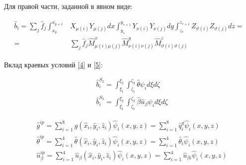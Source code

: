 \documentclass[12pt, a4paper]{article}
\begin{document}
\vspace{3mm}
\noindent Для правой части, заданной в явном виде:

\begin{align}
  \begin{split}
    \hat{b}_i 
    = \sum_{j}\hat{f}_j
      \int_{x_p}^{x_{p+1}}&X_{\mu(i)}Y_{\mu(j)}dx
      \int_{y_s}^{y_{s+1}}Y_{\nu(i)}Y_{\nu(j)}dy
      \int_{z_r}^{z_{r+1}}Z_{\vartheta(i)}Z_{\vartheta(j)}dz = \\
    = &\sum_{j}\hat{f}_j 
      \hat{M}_{\mu(i)\mu(j)}^x 
      \hat{M}_{\nu(i)\nu(j)}^y 
      \hat{M}_{\vartheta(i)\vartheta(j)}^z
  \end{split}
\end{align}

\vspace{3mm}
\noindent Вклад краевых условий \ref{4} и \ref{5}:

\begin{align}
  &\hat{b}_{i}^{S_2} =  \int_{\xi_1}^{\xi_2}
                        \int_{\zeta_1}^{\zeta_2}
                        \hat{\theta}\psi_{i} d\xi d\zeta \\
  &\hat{b}_{i}^{S_3} =  \int_{\xi_1}^{\xi_2}
                      \int_{\zeta_1}^{\zeta_2}
                      \hat{\beta}\hat{u}_{\beta}\psi_{i} d\xi d\zeta
\end{align}

\begin{align}
  &\hat{g}^{ip} 
    = \sum_{i=1}^{8}
        g(\hat{x}_i, \hat{y}_i, \hat{z}_i)\hat{\psi}_i(x, y, z)
    = \sum_{i=1}^{8}
        \hat{q}_{i}^{g}\hat{\psi}_i(x, y, z) \\
  &\hat{\theta}^{ip} 
    = \sum_{i=1}^{4}
        \hat{\theta}(\hat{x}_i, \hat{y}_i, \hat{z}_i)\hat{\psi}_i(x, y, z)
    = \sum_{i=1}^{4}
        \hat{\theta}_{i}\hat{\psi}_i(x, y, z) \\
  &\hat{u}_{\beta}^{ip} 
    = \sum_{i=1}^{4}
        \hat{u}_{\beta}(\hat{x}_i, \hat{y}_i, \hat{z}_i)\hat{\psi}_i(x, y, z)
    = \sum_{i=1}^{4}
        \hat{u}_{\beta i}\hat{\psi}_i(x, y, z)
\end{align}
\end{document}
